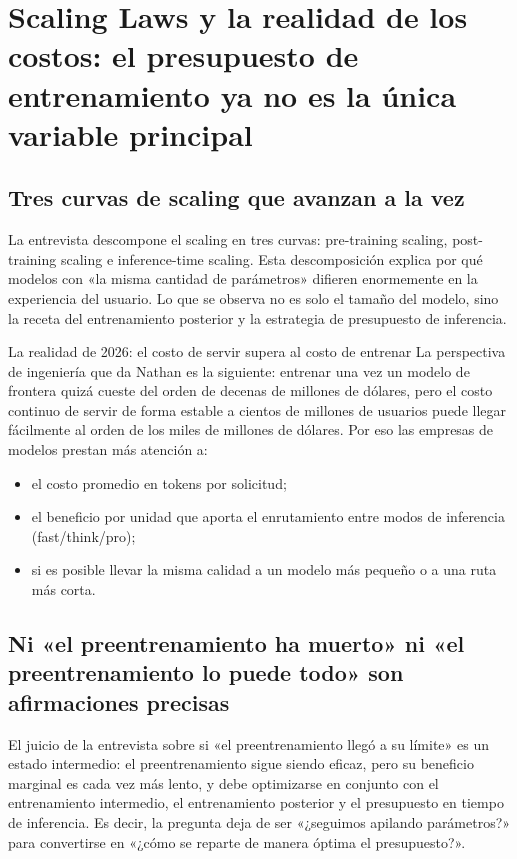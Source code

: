 \section{Scaling Laws y la realidad de los costos: el presupuesto de entrenamiento ya no es la única variable principal}

\subsection{Tres curvas de scaling que avanzan a la vez}

La entrevista descompone el scaling en tres curvas: pre-training scaling, post-training scaling e inference-time scaling. Esta descomposición explica por qué modelos con «la misma cantidad de parámetros» difieren enormemente en la experiencia del usuario. Lo que se observa no es solo el tamaño del modelo, sino la receta del entrenamiento posterior y la estrategia de presupuesto de inferencia.

\begin{importantbox}{La realidad de 2026: el costo de servir supera al costo de entrenar}
La perspectiva de ingeniería que da Nathan es la siguiente: entrenar una vez un modelo de frontera quizá cueste del orden de decenas de millones de dólares, pero el costo continuo de servir de forma estable a cientos de millones de usuarios puede llegar fácilmente al orden de los miles de millones de dólares. Por eso las empresas de modelos prestan más atención a:
\begin{itemize}[leftmargin=1.5em]
    \item el costo promedio en tokens por solicitud;
    \item el beneficio por unidad que aporta el enrutamiento entre modos de inferencia (fast/think/pro);
    \item si es posible llevar la misma calidad a un modelo más pequeño o a una ruta más corta.
\end{itemize}
\end{importantbox}

\subsection{Ni «el preentrenamiento ha muerto» ni «el preentrenamiento lo puede todo» son afirmaciones precisas}

El juicio de la entrevista sobre si «el preentrenamiento llegó a su límite» es un estado intermedio: el preentrenamiento sigue siendo eficaz, pero su beneficio marginal es cada vez más lento, y debe optimizarse en conjunto con el entrenamiento intermedio, el entrenamiento posterior y el presupuesto en tiempo de inferencia. Es decir, la pregunta deja de ser «¿seguimos apilando parámetros?» para convertirse en «¿cómo se reparte de manera óptima el presupuesto?».

